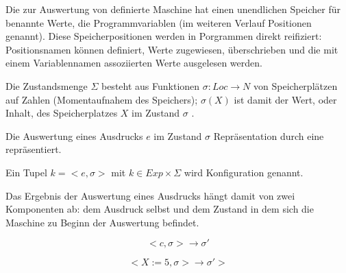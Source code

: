 \documentclass{scrartcl}
\begin{document}
Die zur Auswertung von  definierte Maschine hat einen unendlichen
Speicher für benannte Werte, die Programmvariablen (im weiteren Verlauf
Positionen genannt). Diese Speicherpositionen werden in Porgrammen direkt
reifiziert: Positionsnamen können definiert, Werte zugewiesen, überschrieben
und die mit einem Variablennamen assoziierten Werte ausgelesen werden.

\begin{definition}[Zustand]
Die Zustandsmenge $Σ$ besteht aus Funktionen $σ : Loc → N$ von Speicherplätzen
auf Zahlen (Momentaufnahem des Speichers);
$σ(X)$ ist damit der Wert, oder Inhalt, des Speicherplatzes $X$ im Zustand $σ$ .
\end{definition}

Die Auswertung eines Ausdrucks $e$ im Zustand $σ$
Repräsentation durch eine  repräsentiert. 

\begin{definition}[Konfigurationen]
Ein Tupel $k = <e,σ>$ mit $k ∈ Exp × Σ$ wird Konfiguration genannt.
\end{definition} 

Das Ergebnis der Auswertung eines Ausdrucks hängt damit von
zwei Komponenten ab: dem Ausdruck selbst und dem Zustand in dem sich die 
Maschine zu Beginn der Auswertung befindet.

\begin{definition}
$$<c,σ> → σ'$$
\end{definition}

\begin{example}
$$<X:=5,σ> → σ'>$$
\end{example}
\end{document}
